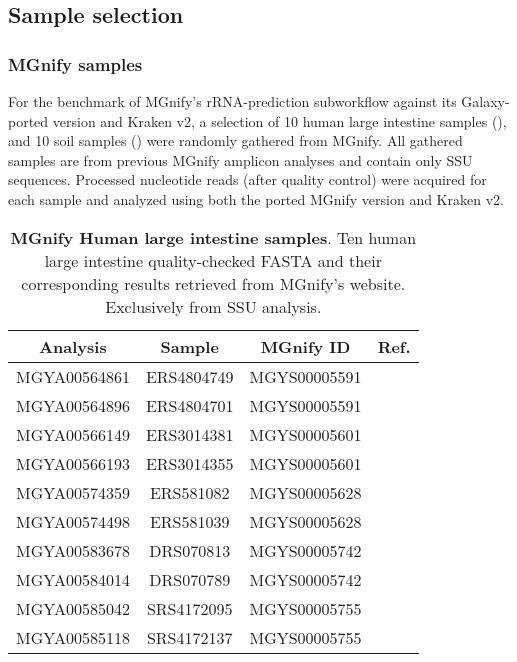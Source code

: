 \subsection{Sample selection}\label{subsec:Sample-Selection}
\subsubsection{MGnify samples}\label{subsubsec:mgnify_samples}
For the benchmark of MGnify's rRNA-prediction subworkflow against its Galaxy-ported version and Kraken v2, a selection of 10 human large intestine samples (), and 10 soil samples () were randomly gathered from MGnify. All gathered samples are from previous MGnify amplicon analyses and contain only SSU sequences. Processed nucleotide reads (after quality control) were acquired for each sample and analyzed using both the ported MGnify version and Kraken v2.
\\
\begin{table}[H]
    \centering
    \begin{tabular}{|c |c| c |c|} 
 \hline
 Analysis & Sample & MGnify ID & Ref. \\ [0.5ex] 
 \hline\hline
 MGYA00564861 & ERS4804749 & MGYS00005591 & ~\cite{noauthor_mgnify_nodate-19} \\ 
 \hline
 MGYA00564896 & ERS4804701 & MGYS00005591 & ~\cite{noauthor_mgnify_nodate-18} \\
 \hline
 MGYA00566149 & ERS3014381 & MGYS00005601 & ~\cite{noauthor_mgnify_nodate-17} \\
 \hline
 MGYA00566193 & ERS3014355 & MGYS00005601 & ~\cite{noauthor_mgnify_nodate-16} \\
 \hline
 MGYA00574359 & ERS581082 & MGYS00005628 & ~\cite{noauthor_mgnify_nodate-15} \\ 
 \hline
 MGYA00574498 & ERS581039 & MGYS00005628 & ~\cite{noauthor_mgnify_nodate-14} \\
 \hline
 MGYA00583678 & DRS070813 & MGYS00005742 & ~\cite{noauthor_mgnify_nodate-13} \\
 \hline
 MGYA00584014 & DRS070789 & MGYS00005742 & ~\cite{noauthor_mgnify_nodate-12} \\
 \hline
 MGYA00585042 & SRS4172095 & MGYS00005755 & ~\cite{noauthor_mgnify_nodate-11} \\
 \hline
 MGYA00585118 & SRS4172137 & MGYS00005755 & ~\cite{noauthor_mgnify_nodate-10} \\ [1ex]
 \hline
\end{tabular}
    \caption[MGnify Human large intestine samples]{\textbf{MGnify Human large intestine samples}. Ten human large intestine quality-checked FASTA and their corresponding results retrieved from MGnify's website. Exclusively from SSU analysis.}
    \label{tab:human-gut-samples}
\end{table}



